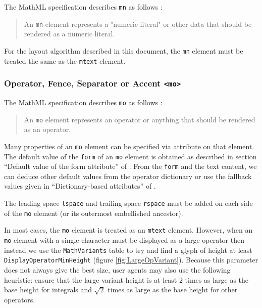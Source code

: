 The MathML specification describes {\tt mn} as follows \cite{MathML3}:
%
\begin{quote}
  An {\tt mn} element represents a "numeric literal" or other data that should
  be rendered as a numeric literal.
\end{quote}

For the layout algorithm described in this document, the
{\tt mn} element must be treated the same as the {\tt mtext} element.

\subsubsection{Operator, Fence, Separator or Accent {\tt <mo>}}\label{Operators}

The MathML specification describes {\tt mo} as follows \cite{MathML3}:
%
\begin{quote}
  An {\tt mo} element represents an operator or anything that should be
  rendered as an operator.
\end{quote}

Many properties of an {\tt mo} element can be specified via attribute on
that element. The default value of the {\tt form} of an {\tt mo} element is
obtained as described in section ``Default value of the form attribute'' of
\cite{MathML3}. From the {\tt form} and the text content, we can deduce other
default values from the operator dictionary or use the fallback values given
in ``Dictionary-based attributes'' of \cite{MathML3}.

The leading space {\tt lspace} and trailing space {\tt rspace} must be added on
each side of the {\tt mo} element (or its outermost embellished ancestor).

In most cases, the {\tt mo} element is treated as an {\tt mtext} element.
However, when an {\tt mo} element with a single character must be displayed as
a large operator then instead we use the {\tt MathVariants}
table to try and find a glyph of height at least {\tt DisplayOperatorMinHeight}
(figure \ref{fig:LargeOpVariant}). Because this parameter does not always give
the best size, user agents may also use the following heuristic: ensure
that the large variant height is at least $2$ times as large as the base height
for integrals and $\sqrt{2}$ times as large as the base height for other
operators.

